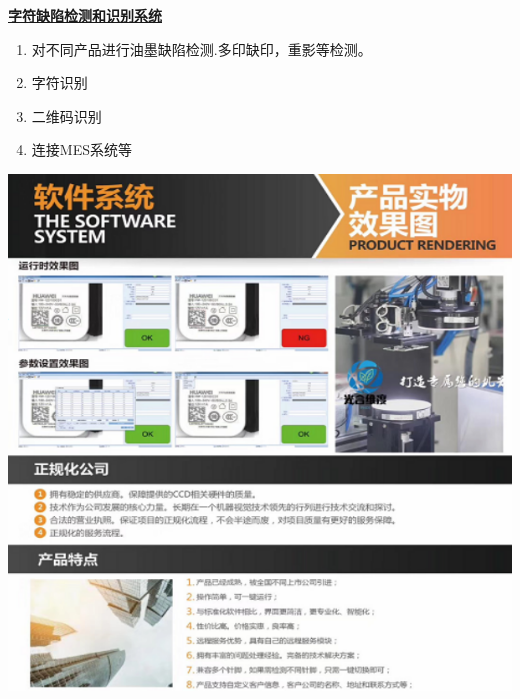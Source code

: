\documentclass[lighthipster]{simplehipstercv}
\begin{document}
\begin{minipage}[t]{\textwidth}
\begin{minipage}[t]{\textwidth}
\begin{minipage}[thbp!]{0.6\textwidth}
			\end{minipage}
			\bigskip
		\end{minipage}
		
		\vspace{5em}
		
		\begin{minipage}[t]{\textwidth}
			\begin{minipage}[thbp!]{0.6\textwidth}
				\textbf{\underline{字符缺陷检测和识别系统}}
				\begin{enumerate}
					\item 对不同产品进行油墨缺陷检测.多印缺印，重影等检测。
					\item 字符识别
					\item 二维码识别
					\item 连接MES系统等
				\end{enumerate}
			\end{minipage}
		\begin{minipage}[thbp]{0.3\textwidth}
			\includegraphics[width=\linewidth]{PrjMy_2.png}
		\end{minipage} \hfill
		\bigskip
		\end{minipage}
		
		\vspace{5em}
		

\end{minipage}
\end{document}
